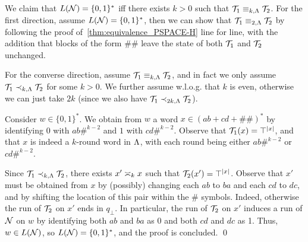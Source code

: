 We claim that $L(\cN)=\{0,1\}^*$ iff there exists $k>0$ such that $\cT_1\equiv_{k,\fL}\cT_2$.
For the first direction, assume $L(\cN)=\{0,1\}^*$, then we can show that $\cT_1\equiv_{2,\fL}\cT_2$ by following the proof of~\cref{thm:equivalence_PSPACE-H} line for line, with the addition that blocks of the form $\#\#$ leave the state of both $\cT_1$ and $\cT_2$ unchanged.

For the converse direction, assume $\cT_1\equiv_{k,\fL}\cT_2$, and in fact we only assume $\cT_1\prec_{k,\fL}\cT_2$ for some $k>0$. We further assume w.l.o.g.\! that $k$ is even, otherwise we can just take $2k$ (since we also have $\cT_1\prec_{2k,\fL}\cT_2$).

Consider $w\in \{0,1\}^*$. We obtain from $w$ a word $x\in (ab+cd+\#\#)^*$ by identifying $0$ with $ab\#^{k-2}$ and $1$ with $cd\#^{k-2}$. Observe that $\cT_1(x)=\top^{|x|}$, and that $x$ is indeed a $k$-round word in $\fL$, with each round being either $ab\#^{k-2}$ or $cd\#^{k-2}$. 

Since $\cT_1\prec_{k,\fL}\cT_2$, there exists $x'\req[k]x$ such that $\cT_2(x')=\top^{|x|}$. Observe that $x'$ must be obtained from $x$ by (possibly) changing each $ab$ to $ba$ and each $cd$ to $dc$, and by shifting the location of this pair within the $\#$ symbols. Indeed, otherwise the run of $\cT_2$ on $x'$ ends in $q_{\bot}$.
In particular, the run of $\cT_2$ on $x'$ induces a run of $\cN$ on $w$ by identifying both $ab$ and $ba$ as 0 and both $cd$ and $dc$ as 1. Thus, $w\in L(\cN)$, so $L(\cN)=\{0,1\}^*$, and the proof is concluded. \qed




